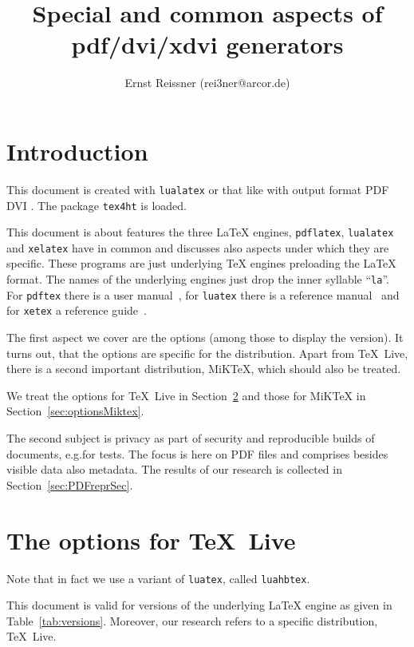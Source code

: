 \documentclass[a4paper]{article}%
\title{Special and common aspects of pdf/dvi/xdvi generators }
\author{Ernst Reissner (rei3ner@arcor.de)}
\date{\Today}
\newcommand{\pdflatex}{\texttt{pdflatex}}
\newcommand{\lualatex}{\texttt{lualatex}}
\newcommand{\xelatex}{\texttt{xelatex}}
\newcommand{\texlive}{\TeX~Live}
\newcommand{\miktex}{MiKTeX}
\begin{document}
\maketitle
\tableofcontents
\listoftables
\lstlistoflistings%

\section{Introduction}

This document is created with \lualatex{} or that like 
with output format 
\ifpdf%
PDF%
\else
DVI%
\fi.
The package \texttt{tex4ht} 
is  loaded. 

This document is about features the three \LaTeX{} engines, 
\pdflatex, \lualatex{} and \xelatex{} have in common 
and discusses also aspects under which they are specific. 
These programs are just underlying \TeX{} engines preloading the \LaTeX{} format. 
The names of the underlying engines just drop the inner syllable ``\texttt{la}''. 
For \texttt{pdftex} there is a user manual~\cite{PdfTexUsr24}, 
for \texttt{luatex} there is a reference manual~\cite{LuaTexRef25} and 
for \texttt{xetex} a reference guide~\cite{XeTexRef25}. 

The first aspect we cover are the options (among those to display the version). 
It turns out, that the options are specific for the distribution. 
Apart from \texlive{}, there is a second important distribution, \miktex, 
which should also be treated. 

We treat the options for \texlive{} in Section~\ref{sec:optionsTexlive} 
and those for \miktex{} in Section~\ref{sec:optionsMiktex}. 

The second subject is privacy as part of security 
and reproducible builds of documents, e.g.\@ for tests. 
The focus is here on PDF files and comprises besides visible data 
also metadata. 
The results of our research is collected in Section~\ref{sec:PDFreprSec}. 

\section{The options for \texlive}\label{sec:optionsTexlive}


Note that in fact we use a variant of \texttt{luatex}, called \texttt{luahbtex}. 

This document is valid for versions of the underlying \LaTeX{} engine 
as given in Table~\ref{tab:versions}. 
Moreover, our research refers to a specific distribution, \texlive. 
\end{document}
